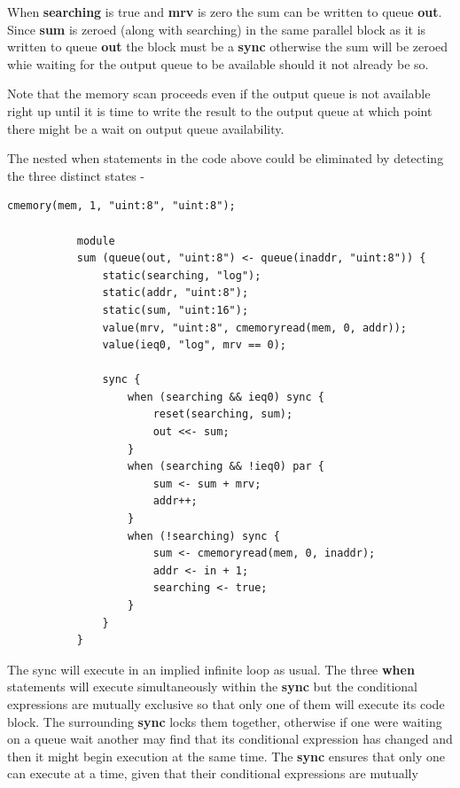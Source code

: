         When {\bf searching} is true and {\bf mrv} is zero the sum can be
        written to queue {\bf out}. Since {\bf sum} is zeroed (along with searching)
        in the same parallel block as it is written to queue {\bf out} the block
        must be a {\bf sync} otherwise the sum will be zeroed whie waiting for
        the output queue to be available should it not already be so.    

        Note that the memory scan proceeds even if the output queue is not
        available right up until it is time to write the result to the output
        queue at which point there might be a wait on output queue availability.
        
        The nested when statements in the code above could be eliminated
        by detecting the three distinct states -
        \begin{lstlisting}[gobble=8, language=threepl]
           cmemory(mem, 1, "uint:8", "uint:8");

           module
           sum (queue(out, "uint:8") <- queue(inaddr, "uint:8")) {
               static(searching, "log");
               static(addr, "uint:8");
               static(sum, "uint:16");
               value(mrv, "uint:8", cmemoryread(mem, 0, addr));
               value(ieq0, "log", mrv == 0);

               sync {
                   when (searching && ieq0) sync {
                       reset(searching, sum);
                       out <<- sum;
                   }
                   when (searching && !ieq0) par {
                       sum <- sum + mrv;
                       addr++;
                   }
                   when (!searching) sync {
                       sum <- cmemoryread(mem, 0, inaddr);
                       addr <- in + 1;
                       searching <- true;
                   }
               }
           }
        \end{lstlisting}
        The sync will execute in an implied infinite loop as usual. The three
        {\bf when} statements will execute simultaneously within the {\bf sync}
        but the conditional expressions are mutually exclusive so that only one
        of them will execute its code block. The surrounding {\bf sync} locks
        them together, otherwise if one were waiting on a queue wait another may
        find that its conditional expression has changed and then it might begin
        execution at the same time. The {\bf sync} ensures that only one can execute
        at a time, given that their conditional expressions are mutually

